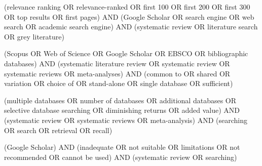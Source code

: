\begin{description}[style=nextline,font=\normalfont\bfseries]
\item[q3f, support query] {\footnotesize\ttfamily\raggedright (\textquotedbl{}relevance ranking\textquotedbl{} OR \textquotedbl{}relevance-ranked\textquotedbl{} OR \textquotedbl{}first 100\textquotedbl{} OR \textquotedbl{}first 200\textquotedbl{} OR \textquotedbl{}first 300\textquotedbl{} OR \textquotedbl{}top results\textquotedbl{} OR \textquotedbl{}first pages\textquotedbl{}) AND (\textquotedbl{}Google Scholar\textquotedbl{} OR \textquotedbl{}search engine\textquotedbl{} OR \textquotedbl{}web search\textquotedbl{} OR \textquotedbl{}academic search engine\textquotedbl{}) AND (\textquotedbl{}systematic review\textquotedbl{} OR \textquotedbl{}literature search\textquotedbl{} OR \textquotedbl{}grey literature\textquotedbl{})\par}
\item[q3g, support query] {\footnotesize\ttfamily\raggedright (Scopus OR \textquotedbl{}Web of Science\textquotedbl{} OR \textquotedbl{}Google Scholar\textquotedbl{} OR EBSCO OR \textquotedbl{}bibliographic databases\textquotedbl{}) AND (\textquotedbl{}systematic literature review\textquotedbl{} OR \textquotedbl{}systematic review\textquotedbl{} OR \textquotedbl{}systematic reviews\textquotedbl{} OR \textquotedbl{}meta-analyses\textquotedbl{}) AND (\textquotedbl{}common to\textquotedbl{} OR shared OR variation OR \textquotedbl{}choice of\textquotedbl{} OR \textquotedbl{}stand-alone\textquotedbl{} OR \textquotedbl{}single database\textquotedbl{} OR sufficient)\par}
\item[q3h, support query] {\footnotesize\ttfamily\raggedright (\textquotedbl{}multiple databases\textquotedbl{} OR \textquotedbl{}number of databases\textquotedbl{} OR \textquotedbl{}additional databases\textquotedbl{} OR \textquotedbl{}selective database searching\textquotedbl{} OR \textquotedbl{}diminishing returns\textquotedbl{} OR \textquotedbl{}added value\textquotedbl{}) AND (\textquotedbl{}systematic review\textquotedbl{} OR \textquotedbl{}systematic reviews\textquotedbl{} OR \textquotedbl{}meta-analysis\textquotedbl{}) AND (searching OR search OR retrieval OR recall)\par}
\item[q3x, counter query] {\footnotesize\ttfamily\raggedright (\textquotedbl{}Google Scholar\textquotedbl{}) AND (inadequate OR \textquotedbl{}not suitable\textquotedbl{} OR limitations OR \textquotedbl{}not recommended\textquotedbl{} OR \textquotedbl{}cannot be used\textquotedbl{}) AND (\textquotedbl{}systematic review\textquotedbl{} OR searching)\par}

\end{description}
